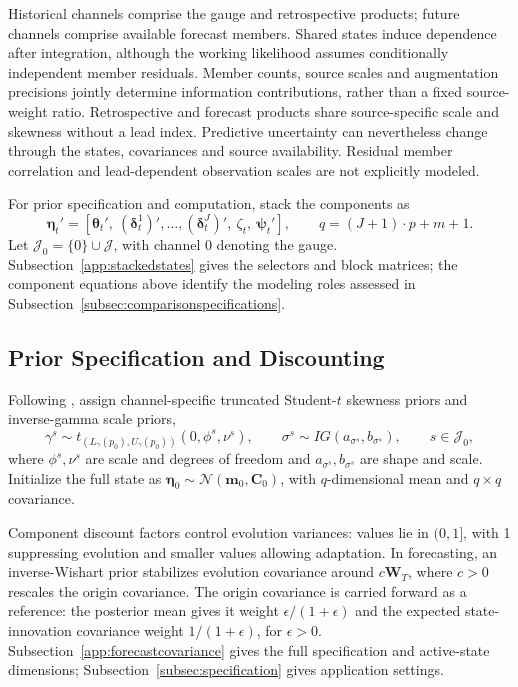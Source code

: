 \documentclass[APA,STIX1COL]{WileyNJD-v2}
\begin{document}
Historical channels comprise the gauge and retrospective products; future channels comprise available forecast members. Shared states induce dependence after integration, although the working likelihood assumes conditionally independent member residuals. Member counts, source scales and augmentation precisions jointly determine information contributions, rather than a fixed source-weight ratio. Retrospective and forecast products share source-specific scale and skewness without a lead index. Predictive uncertainty can nevertheless change through the states, covariances and source availability. Residual member correlation and lead-dependent observation scales are not explicitly modeled.

For prior specification and computation, stack the components as
\[
\boldsymbol\eta_t'=[\boldsymbol\theta_t',\ (\boldsymbol\delta_t^1)',\ldots,(\boldsymbol\delta_t^J)',\ \zeta_t,\ \boldsymbol\psi_t'],
\qquad q=(J+1)\cdot p+m+1.
\]
Let $\mathcal J_0=\{0\}\cup\mathcal J$, with channel 0 denoting the gauge. Subsection~\ref{app:stackedstates} gives the selectors and block matrices; the component equations above identify the modeling roles assessed in Subsection~\ref{subsec:comparisonspecifications}.

\subsection{Prior Specification and Discounting}
\label{subsec:prioranddisc}
Following \citet{barata2021_flex_quantile}, assign channel-specific truncated Student-$t$ skewness priors and inverse-gamma scale priors,
\[
\gamma^s\sim t_{(L_\gamma(p_0),U_\gamma(p_0))}(0,\phi^s,\nu^s),\qquad
\sigma^s\sim IG(a_{\sigma^s},b_{\sigma^s}),\qquad s\in\mathcal J_0,
\]
where $\phi^s,\nu^s$ are scale and degrees of freedom and $a_{\sigma^s},b_{\sigma^s}$ are shape and scale. Initialize the full state as $\boldsymbol\eta_0\sim\mathcal N(\mathbf m_0,\mathbf C_0)$, with $q$-dimensional mean and $q\times q$ covariance.

Component discount factors \citep{prado2021time} control evolution variances: values lie in $(0,1]$, with 1 suppressing evolution and smaller values allowing adaptation. In forecasting, an inverse-Wishart prior stabilizes evolution covariance around $c\mathbf W_T$, where $c>0$ rescales the origin covariance. The origin covariance is carried forward as a reference: the posterior mean gives it weight $\epsilon/(1+\epsilon)$ and the expected state-innovation covariance weight $1/(1+\epsilon)$, for $\epsilon>0$. Subsection~\ref{app:forecastcovariance} gives the full specification and active-state dimensions; Subsection~\ref{subsec:specification} gives application settings.
\end{document}
